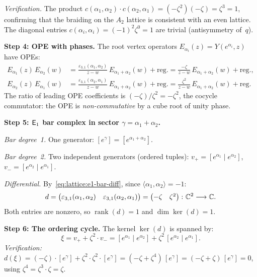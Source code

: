 \begin{computation}[\texorpdfstring{$A_2$}{A_2} at the Coxeter root: \texorpdfstring{$N = 3$}{N = 3}, \texorpdfstring{$q = 1$}{q = 1}]
\noindent\emph{Verification.}  The product
$c(\alpha_1,\alpha_2) \cdot c(\alpha_2,\alpha_1)
= (-\zeta^2)(-\zeta) = \zeta^3 = 1$, confirming that the braiding
on the $A_2$ lattice is consistent with an even lattice.
The diagonal entries
$c(\alpha_i,\alpha_i) = (-1)^{2}\zeta^{0} = 1$
are trivial (antisymmetry of~$q$).
\smallskip

\noindent\textbf{Step 4: OPE with phases.}
The root vertex operators
$E_{\alpha_i}(z) = Y(e^{\alpha_i}, z)$ have OPEs:
\begin{align*}
E_{\alpha_1}(z)\, E_{\alpha_2}(w)
&= \frac{\varepsilon_{3,1}(\alpha_1,\alpha_2)}{z - w}
   \,E_{\alpha_1+\alpha_2}(w) + \mathrm{reg.}
= \frac{-\zeta}{z - w}\,E_{\alpha_1+\alpha_2}(w) + \mathrm{reg.}, \\
E_{\alpha_2}(z)\, E_{\alpha_1}(w)
&= \frac{\varepsilon_{3,1}(\alpha_2,\alpha_1)}{z - w}
   \,E_{\alpha_1+\alpha_2}(w) + \mathrm{reg.}
= \frac{\zeta^2}{z - w}\,E_{\alpha_1+\alpha_2}(w) + \mathrm{reg.}
\end{align*}
The ratio of leading OPE coefficients is
$(-\zeta)/\zeta^2 = -\zeta^2$, the cocycle commutator: the OPE is
\emph{non-commutative} by a cube root of unity phase.
\smallskip

\noindent\textbf{Step 5: $\mathsf{E}_1$ bar complex in sector
$\gamma = \alpha_1 + \alpha_2$.}

\emph{Bar degree~1.}
One generator: $[e^{\gamma}] = [e^{\alpha_1+\alpha_2}]$.

\emph{Bar degree~2.}
Two independent generators (ordered tuples):
$v_+ = [e^{\alpha_1} \mid e^{\alpha_2}]$,\;
$v_- = [e^{\alpha_2} \mid e^{\alpha_1}]$.

\emph{Differential.}
By~\eqref{eq:lattice:e1-bar-diff}, since
$\langle\alpha_1,\alpha_2\rangle = -1$:
\[
d =
\begin{pmatrix}
\varepsilon_{3,1}(\alpha_1,\alpha_2) &
\varepsilon_{3,1}(\alpha_2,\alpha_1)
\end{pmatrix}
=
\begin{pmatrix} -\zeta & \zeta^2 \end{pmatrix}
\colon \mathbb{C}^2 \longrightarrow \mathbb{C}.
\]
Both entries are nonzero, so $\operatorname{rank}(d) = 1$
and $\dim\ker(d) = 1$.
\smallskip

\noindent\textbf{Step 6: The ordering cycle.}
The kernel $\ker(d)$ is spanned by:
\begin{equation}\label{eq:lattice:a2-n3-cycle}
\xi = v_+ + \zeta^2 \cdot v_-
= [e^{\alpha_1} \mid e^{\alpha_2}]
  + \zeta^2\,[e^{\alpha_2} \mid e^{\alpha_1}].
\end{equation}
\emph{Verification:}
$d(\xi) = (-\zeta) \cdot [e^\gamma]
  + \zeta^2 \cdot \zeta^2 \cdot [e^\gamma]
= (-\zeta + \zeta^4)\,[e^\gamma]
= (-\zeta + \zeta)\,[e^\gamma]
= 0$,
using $\zeta^4 = \zeta^3 \cdot \zeta = \zeta$.


\end{computation}
